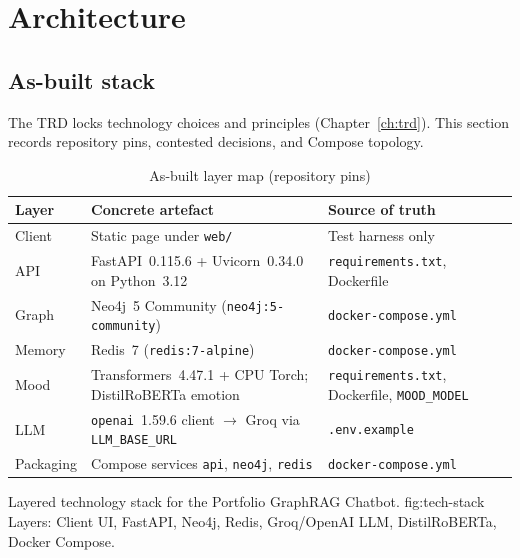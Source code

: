\chapter{Architecture}
\label{ch:architecture}
\label{ch:stack}

\section{As-built stack}

The TRD locks technology choices and principles (Chapter~\ref{ch:trd}). This section records repository pins, contested decisions, and Compose topology.

\begin{table}[!htbp]
\centering
\small
\caption{As-built layer map (repository pins)}
\label{tab:stack-map}
\begin{tabularx}{\textwidth}{@{}
  >{\raggedright\arraybackslash}p{}
  >{\raggedright\arraybackslash}p{}
  >{\raggedright\arraybackslash}X
  @{}}
\toprule
\textbf{Layer} & \textbf{Concrete artefact} & \textbf{Source of truth} \\
\midrule
Client & Static page under \texttt{web/} & Test harness only \\
\addlinespace
API & FastAPI~0.115.6 + Uvicorn~0.34.0 on Python~3.12 & \texttt{requirements.txt}, Dockerfile \\
\addlinespace
Graph & Neo4j~5 Community (\texttt{neo4j:5-community}) & \texttt{docker-compose.yml} \\
\addlinespace
Memory & Redis~7 (\texttt{redis:7-alpine}) & \texttt{docker-compose.yml} \\
\addlinespace
Mood & Transformers~4.47.1 + CPU Torch; DistilRoBERTa emotion & \texttt{requirements.txt}, Dockerfile, \texttt{MOOD\_MODEL} \\
\addlinespace
LLM & \texttt{openai}~1.59.6 client $\rightarrow$ Groq via \texttt{LLM\_BASE\_URL} & \texttt{.env.example} \\
\addlinespace
Packaging & Compose services \texttt{api}, \texttt{neo4j}, \texttt{redis} & \texttt{docker-compose.yml} \\
\bottomrule
\end{tabularx}
\end{table}

%
{Layered technology stack for the Portfolio GraphRAG Chatbot.}%
{fig:tech-stack}%
{Layers: Client UI, FastAPI, Neo4j, Redis, Groq/OpenAI LLM, DistilRoBERTa, Docker Compose.}

